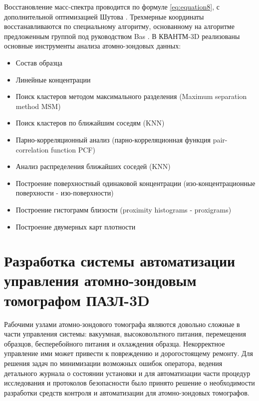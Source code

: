 Восстановление масс-спектра проводится по формуле \cref{eq:equation8}, с дополнительной оптимизацией Шутова \cite{Shutov19}. Трехмерные координаты восстанавливаются по специальному алгоритму, основанному на алгоритме предложенным группой под руководством Bas \cite{Bas95}. В КВАНТМ-3D реализованы основные инструменты анализа атомно-зондовых данных:

\begin{itemize}
	\item Состав образца
	\item Линейные концентрации
	\item Поиск кластеров методом максимального разделения (Maximum separation method MSM)
	\item Поиск кластеров по ближайшим соседям (KNN)
	\item Парно-корреляционный анализ (парно-корреляционная функция pair-correlation function PCF)
	\item Анализ распределения ближайших соседей (KNN)
	\item Построение поверхностный одинаковой концентрации (изо-концентрационные поверхности - изо-поверхности)
	\item Построение гистограмм близости (proximity histograms - proxigrams)
	\item Построение двумерных карт плотности
\end{itemize}

\FloatBarrier
\section{Разработка системы автоматизации управления атомно-зондовым томографом ПАЗЛ-3D}\label{sec:ch2/sec6}

Рабочими узлами атомно-зондового томографа являются довольно сложные в части управления системы: вакуумная, высоковольтного питания, перемещения образцов, бесперебойного питания и охлаждения образца. Некорректное управление ими может привести к повреждению и дорогостоящему ремонту. Для решения задач по минимизации возможных ошибок оператора, ведения детального журнала о состоянии установки и для автоматизации части процедур исследования и протоколов безопасности было принято решение о необходимости разработки средств контроля и автоматизации для атомно-зондовых томографов. 

